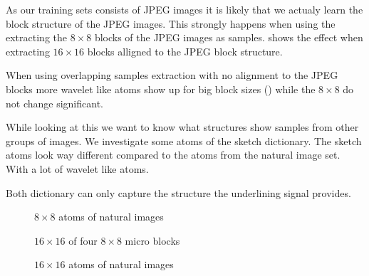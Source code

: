 As our training sets consists of JPEG images it is likely that we actualy learn
the block structure of the JPEG images. This strongly happens when using the
extracting the $8\times 8$ blocks of the JPEG images as samples.
 shows the effect when extracting $16\times 16$
blocks alligned to the JPEG block structure.

When using overlapping samples extraction with no alignment to the JPEG blocks
more wavelet like atoms show up for big block sizes ()
while the $8\times 8$ do not change significant. 

While looking at this we want to know what structures show samples from other
groups of images. We investigate some atoms of the sketch dictionary.
The sketch atoms look way different compared to the atoms from the natural
image set. With a lot of wavelet like atoms. 

Both dictionary can only capture the structure the underlining signal provides. 

\begin{figure}[h]
\centering
{}
\hspace{5mm}
\hspace{5mm}
\hspace{5mm}
\caption{$8\times 8$ atoms of natural images}
\label{fig:8atoms}
\end{figure}
\begin{figure}[h]
\centering
{}
\caption{$16\times 16$ of four $8\times 8$ micro blocks}
\label{fig:16jpeg_atoms}
\end{figure}
\begin{figure}[h]
\centering
{}
\caption{$16\times 16$ atoms of natural images}
\label{fig:16atoms}
\end{figure}


